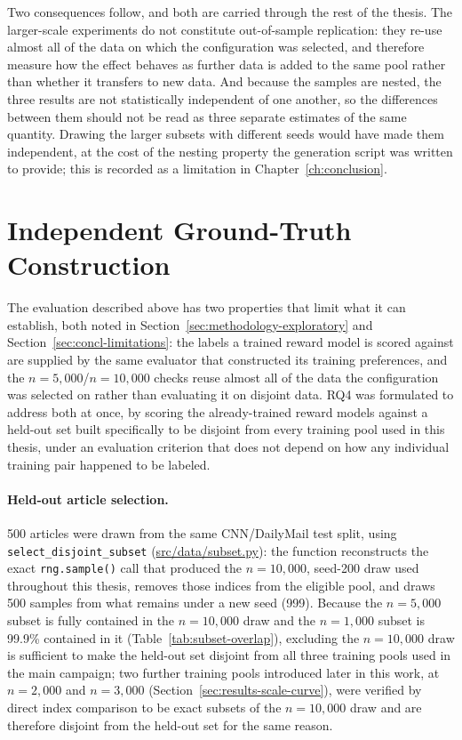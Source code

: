 Two consequences follow, and both are carried through the rest of the thesis. The
larger-scale experiments do not constitute out-of-sample replication: they re-use
almost all of the data on which the configuration was selected, and therefore
measure how the effect behaves as further data is added to the same pool rather
than whether it transfers to new data. And because the samples are nested, the
three results are not statistically independent of one another, so the differences
between them should not be read as three separate estimates of the same quantity.
Drawing the larger subsets with different seeds would have made them independent,
at the cost of the nesting property the generation script was written to provide;
this is recorded as a limitation in Chapter~\ref{ch:conclusion}.

\section{Independent Ground-Truth Construction}
\label{sec:methodology-ground-truth}

The evaluation described above has two properties that limit what it can
establish, both noted in Section~\ref{sec:methodology-exploratory} and
Section~\ref{sec:concl-limitations}: the labels a trained reward model is
scored against are supplied by the same evaluator that constructed its
training preferences, and the $n=5{,}000$/$n=10{,}000$ checks reuse almost
all of the data the configuration was selected on rather than evaluating it
on disjoint data. RQ4 was formulated to address both at once, by scoring the
already-trained reward models against a held-out set built specifically to
be disjoint from every training pool used in this thesis, under an
evaluation criterion that does not depend on how any individual training
pair happened to be labeled.

\paragraph{Held-out article selection.} 500 articles were drawn from the same
CNN/DailyMail test split, using \texttt{select\_disjoint\_subset}
(\url{src/data/subset.py}): the function reconstructs the exact
\texttt{rng.sample()} call that produced the $n=10{,}000$, seed-200 draw used
throughout this thesis, removes those indices from the eligible pool, and
draws 500 samples from what remains under a new seed (999). Because the
$n=5{,}000$ subset is fully contained in the $n=10{,}000$ draw and the
$n=1{,}000$ subset is 99.9\% contained in it
(Table~\ref{tab:subset-overlap}), excluding the $n=10{,}000$ draw is
sufficient to make the held-out set disjoint from all three training pools
used in the main campaign; two further training pools introduced later in
this work, at $n=2{,}000$ and $n=3{,}000$ (Section~\ref{sec:results-scale-curve}),
were verified by direct index comparison to be exact subsets of the
$n=10{,}000$ draw and are therefore disjoint from the held-out set for the
same reason.

